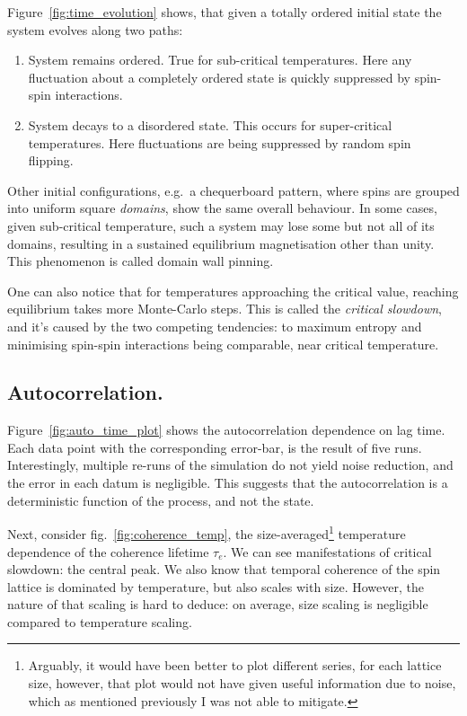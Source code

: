 \documentclass[12pt]{article}
\begin{document}
Figure~\ref{fig:time_evolution} shows, that given a totally ordered initial state the system evolves along two paths:

\begin{enumerate}
\item System remains ordered. True for sub-critical temperatures. Here any fluctuation about a completely ordered state is quickly suppressed by spin-spin interactions.
\item System decays to a disordered state. This occurs for super-critical temperatures. Here fluctuations are being suppressed by random spin flipping. 
\end{enumerate}

Other initial configurations, e.g.~a chequerboard pattern,  where spins are grouped into uniform square \emph{domains}, show the same overall behaviour. In some cases, given sub-critical temperature, such a system may lose some but not all of its domains, resulting in a sustained equilibrium magnetisation other than unity. This phenomenon is called domain wall pinning.

One can also notice that for temperatures approaching the critical value, reaching equilibrium takes more Monte-Carlo steps. This is called the \emph{critical slowdown}, and it's caused by the two competing tendencies: to maximum entropy and minimising spin-spin interactions being comparable, near critical temperature. 



\subsection{Autocorrelation.}

Figure~\ref{fig:auto_time_plot} shows the autocorrelation dependence on lag time. Each data point with the corresponding error-bar, is the result of five runs. Interestingly, multiple re-runs of the simulation do not yield noise reduction, and the error in each datum is negligible. This suggests that the autocorrelation is a deterministic function of the process, and not the state.

Next, consider fig.~\ref{fig:coherence_temp}, the size-averaged\footnote{Arguably, it would have been better to plot different series, for each lattice size, however, that plot would not have given useful information due to noise, which as mentioned previously I was not able to mitigate.} temperature dependence of the coherence lifetime \(\tau_e\). We can see manifestations of critical slowdown: the central peak. We also know that temporal coherence of the spin lattice is dominated by temperature, but also scales with size. However, the nature of that scaling is hard to deduce: on average, size scaling is negligible compared to temperature scaling.
\end{document}
